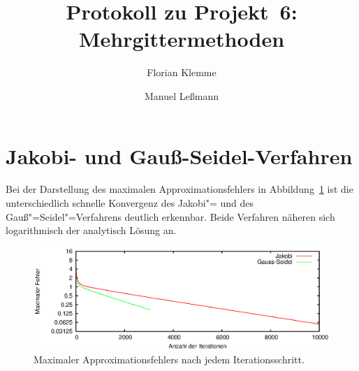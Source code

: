 \documentclass[paper = a4]{scrartcl}
\begin{document}
\subject{Praktikum Multicore"=Programmierung}
\title{Protokoll zu Projekt~6: Mehrgittermethoden}
\author{Florian Klemme \and Manuel Leßmann}
\maketitle

\section{Jakobi- und Gauß-Seidel-Verfahren}




Bei der Darstellung des maximalen Approximationsfehlers in Abbildung~\ref{fig:fehler} ist die unterschiedlich schnelle Konvergenz des Jakobi"= und des Gauß"=Seidel"=Verfahrens deutlich erkennbar. Beide Verfahren näheren sich logarithmisch der analytisch Lösung an.

\begin{figure}
    \centering
    \includegraphics[width=\textwidth]{fehler}
    \caption{Maximaler Approximationsfehlers nach jedem Iterationsschritt.}
    \label{fig:fehler}
\end{figure}
\end{document}
